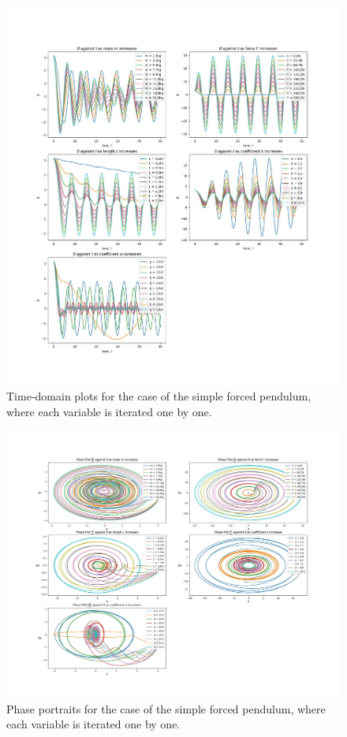 \documentclass[10pt, twocolumn]{article}
\begin{document}
\onecolumn
\begin{figure}[H]
    \centering
    \includegraphics[height=0.9\textheight]{Projects/ForcedSimplePendulum/Plots/test_plots.jpg}
    \caption{Time-domain plots for the case of the simple forced pendulum, where each variable is iterated one by one.}
    \label{time domain test}
\end{figure}

\begin{figure}[H]
    \centering
    \includegraphics[height=0.9\textheight]{Projects/ForcedSimplePendulum/Plots/test_plots_phase.jpg}
    \caption{Phase portraits for the case of the simple forced pendulum, where each variable is iterated one by one.}
    \label{phase portrait}
\end{figure}
\end{document}
